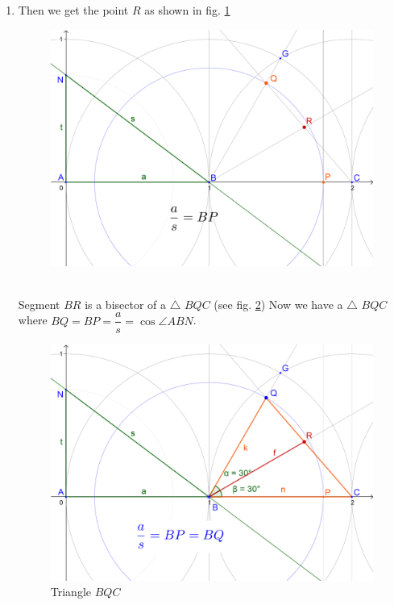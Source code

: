 \documentclass[12pt, letterpaper, oneside]{report}
\begin{document}
\begin{enumerate}
\begin{figure}[h]
\end{figure}
	\item Then we get the point $R$ as shown in fig. \ref{fig:anbopqr}\\
\begin{figure}[h]
	\centerline{\includegraphics[scale=0.14]{img/anbopqR.png}}
	\caption{}
	\label{fig:anbopqr}
\end{figure}\\
	Segment $BR$ is a bisector of a $\triangle$ $BQC$  (see fig. \ref{fig:bqc})
\newpage
Now we have a $\triangle$ $BQC$ where $BQ=BP=\dfrac{a}{s}=\cos \angle ABN$.
\begin{figure}[H]
		\centerline{\includegraphics[scale=0.15]{img/BQC.png}}
		\caption{Triangle $BQC$}
		\label{fig:bqc}
\end{figure}

\end{enumerate}
\end{document}
